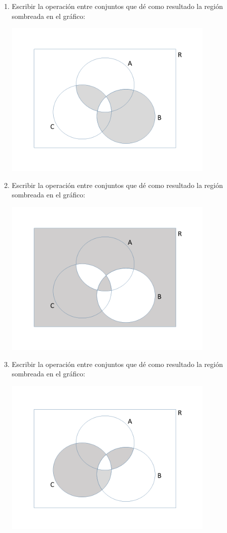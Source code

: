 \documentclass[12pt]{article}
\begin{document}
\begin{enumerate}
\item  
Escribir la operación entre conjuntos que dé como resultado la  región sombreada en el gráfico:
\begin{center} 
\includegraphics[width= 0.8\textwidth]{ej1_3.png} 
\end{center}

\item  
Escribir la operación entre conjuntos que dé como resultado la  región sombreada en el gráfico:
\begin{center} 
\includegraphics[width= 0.8\textwidth]{ej1_4.png} 
\end{center}

\item  
Escribir la operación entre conjuntos que dé como resultado la  región sombreada en el gráfico:
\begin{center} 
\includegraphics[width= 0.8\textwidth]{ej1_5.png} 
\end{center}


\end{enumerate}
\end{document}
